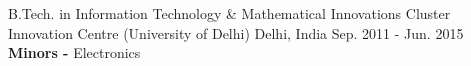 

\begin{cventries}

  \cventry
    {B.Tech. in Information Technology \& Mathematical Innovations} %
    {Cluster Innovation Centre (University of Delhi)} %
    {Delhi, India} %
    {Sep. 2011 - Jun. 2015} %
    {{\textbf{Minors - } Electronics}}

\end{cventries}
